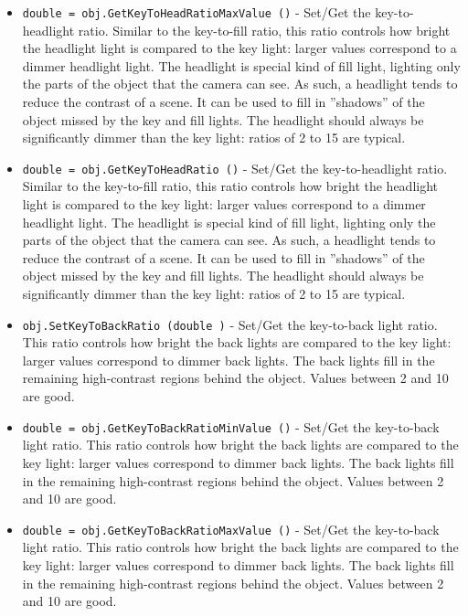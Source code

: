 \begin{itemize}
\item  \verb|double = obj.GetKeyToHeadRatioMaxValue ()| -  Set/Get the key-to-headlight ratio.  Similar to the key-to-fill
 ratio, this ratio controls how bright the headlight light is
 compared to the key light: larger values correspond to a dimmer
 headlight light.  The headlight is special kind of fill light,
 lighting only the parts of the object that the camera can see.
 As such, a headlight tends to reduce the contrast of a scene.  It
 can be used to fill in ''shadows'' of the object missed by the key
 and fill lights.  The headlight should always be significantly
 dimmer than the key light:  ratios of 2 to 15 are typical.

\item  \verb|double = obj.GetKeyToHeadRatio ()| -  Set/Get the key-to-headlight ratio.  Similar to the key-to-fill
 ratio, this ratio controls how bright the headlight light is
 compared to the key light: larger values correspond to a dimmer
 headlight light.  The headlight is special kind of fill light,
 lighting only the parts of the object that the camera can see.
 As such, a headlight tends to reduce the contrast of a scene.  It
 can be used to fill in ''shadows'' of the object missed by the key
 and fill lights.  The headlight should always be significantly
 dimmer than the key light:  ratios of 2 to 15 are typical.

\item  \verb|obj.SetKeyToBackRatio (double )| -  Set/Get the key-to-back light ratio.  This ratio controls
 how bright the back lights are compared to the key light: larger
 values correspond to dimmer back lights.  The back lights fill
 in the remaining high-contrast regions behind the object.
 Values between 2 and 10 are good.

\item  \verb|double = obj.GetKeyToBackRatioMinValue ()| -  Set/Get the key-to-back light ratio.  This ratio controls
 how bright the back lights are compared to the key light: larger
 values correspond to dimmer back lights.  The back lights fill
 in the remaining high-contrast regions behind the object.
 Values between 2 and 10 are good.

\item  \verb|double = obj.GetKeyToBackRatioMaxValue ()| -  Set/Get the key-to-back light ratio.  This ratio controls
 how bright the back lights are compared to the key light: larger
 values correspond to dimmer back lights.  The back lights fill
 in the remaining high-contrast regions behind the object.
 Values between 2 and 10 are good.


\end{itemize}
